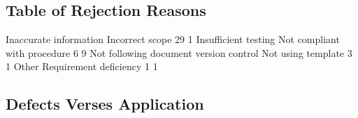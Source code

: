 \documentclass{article}
\begin{document}
\subsection{Table of Rejection Reasons}
\begin{Schunk}
\begin{Soutput}
                Inaccurate information                        Incorrect scope 
                                    29                                      1 
                  Insufficient testing           Not compliant with procedure 
                                     6                                      9 
Not following document version control                     Not using template 
                                     3                                      1 
                                 Other                 Requirement deficiency 
                                     1                                      1 
\end{Soutput}
\end{Schunk}

\subsection{Defects Verses Application}
\end{document}
